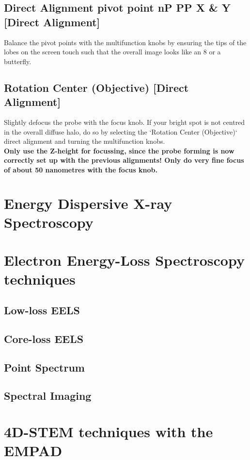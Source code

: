 \documentclass[a4paper]{scrartcl}
\begin{document}
\subsection*{Direct Alignment pivot point nP PP X \& Y [Direct Alignment]}
Balance the pivot points with the multifunction knobs by ensuring the tips of the lobes on the screen touch such that the overall image looks like an 8 or a butterfly.

\subsection*{Rotation Center (Objective) [Direct Alignment]}
Slightly defocus the probe with the focus knob. If your bright spot is not centred in the overall diffuse halo, do so by selecting the `Rotation Center (Objective)` direct alignment and turning the multifunction knobs.\\

\noindent\textbf{Only use the Z-height for focussing, since the probe forming is now correctly set up with the previous alignments! Only do very fine focus of about 50 nanometres with the focus knob.}


\section*{Energy Dispersive X-ray Spectroscopy}

\section*{Electron Energy-Loss Spectroscopy techniques}
\subsection*{Low-loss EELS}
\subsection*{Core-loss EELS}
\subsection*{Point Spectrum}
\subsection*{Spectral Imaging}

\section*{4D-STEM techniques with the EMPAD}
\end{document}

